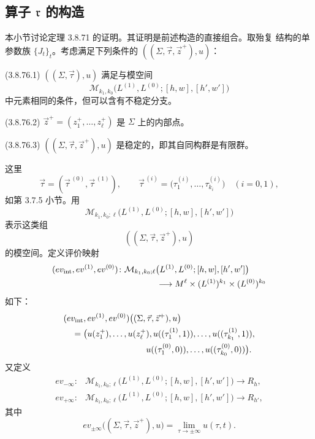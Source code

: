 \subsection{算子 \texorpdfstring{$\mathfrak r$}{r} 的构造}
\label{subsec:3-8-8}

本小节讨论定理 3.8.71 的证明。其证明是前述构造的直接组合。取殆复
结构的单参数族 $\{J_t\}_t$。考虑满足下列条件的
$((\Sigma,\vec\tau,\vec z^+),u)$：

\noindent\textup{(3.8.76.1)}
$((\Sigma,\vec\tau),u)$ 满足与模空间
\[
 \mathcal M_{k_1,k_0}
 \bigl(L^{(1)},L^{(0)};[h,w],[h',w']\bigr)
\]
中元素相同的条件，但可以含有不稳定分支。

\noindent\textup{(3.8.76.2)}
$\vec z^+=(z_1^+,\ldots,z_\ell^+)$ 是 $\Sigma$ 上的内部点。

\noindent\textup{(3.8.76.3)}
$((\Sigma,\vec\tau,\vec z^+),u)$ 是稳定的，即其自同构群是有限群。

这里
\[
 \vec\tau=(\vec\tau^{\,(0)},\vec\tau^{\,(1)}),
 \qquad
 \vec\tau^{\,(i)}
 =\bigl(\tau_1^{(i)},\ldots,\tau_{k_i}^{(i)}\bigr)
 \quad(i=0,1),
\]
如第 3.7.5 小节。用
\[
 \mathcal M_{k_1,k_0;\ell}
 \bigl(L^{(1)},L^{(0)};[h,w],[h',w']\bigr)
\]
表示这类组
\[
 ((\Sigma,\vec\tau,\vec z^+),u)
\]
的模空间。定义评价映射
\[
\begin{aligned}
 &(ev_{\mathrm{int}},ev^{(1)},ev^{(0)})\colon
 \mathcal M_{k_1,k_0;\ell}
 \bigl(L^{(1)},L^{(0)};[h,w],[h',w']\bigr)\\
 &\hspace{43mm}\longrightarrow
 M^\ell\times(L^{(1)})^{k_1}\times(L^{(0)})^{k_0}
\end{aligned}
\]
如下：
\[
\begin{aligned}
 &(ev_{\mathrm{int}},ev^{(1)},ev^{(0)})
 \bigl((\Sigma,\vec\tau,\vec z^+),u\bigr)\\
 &\quad=
 \bigl(
 u(z_1^+),\ldots,u(z_\ell^+),
 u((\tau_1^{(1)},1)),\ldots,u((\tau_{k_1}^{(1)},1)),\\
 &\hspace{34mm}
 u((\tau_1^{(0)},0)),\ldots,u((\tau_{k_0}^{(0)},0))
 \bigr).
\end{aligned}
\]
又定义
\[
\begin{aligned}
 ev_{-\infty}\colon&
 \mathcal M_{k_1,k_0;\ell}
 \bigl(L^{(1)},L^{(0)};[h,w],[h',w']\bigr)
 \longrightarrow R_h,\\
 ev_{+\infty}\colon&
 \mathcal M_{k_1,k_0;\ell}
 \bigl(L^{(1)},L^{(0)};[h,w],[h',w']\bigr)
 \longrightarrow R_{h'},
\end{aligned}
\]
其中
\[
 ev_{\pm\infty}
 \bigl((\Sigma,\vec\tau,\vec z^+),u\bigr)
 =\lim_{\tau\to\pm\infty}u(\tau,t).
\]

